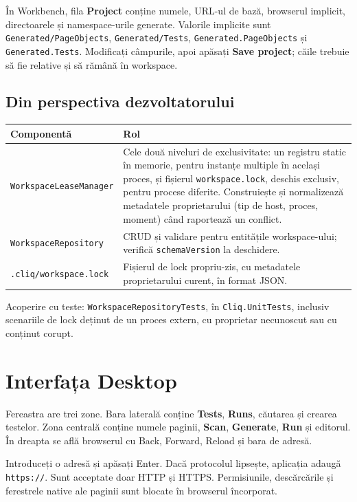 \documentclass[12pt,a4paper]{report}
\newcommand{\UI}[1]{\textbf{#1}}
\newcommand{\File}[1]{\nolinkurl{#1}}
\begin{document}
În Workbench, fila \UI{Project} conține numele, URL-ul de bază, browserul implicit, directoarele și namespace-urile generate. Valorile implicite sunt \File{Generated/PageObjects}, \File{Generated/Tests}, \File{Generated.PageObjects} și \File{Generated.Tests}. Modificați câmpurile, apoi apăsați \UI{Save project}; căile trebuie să fie relative și să rămână în workspace.

\section{Din perspectiva dezvoltatorului}

\begin{tabularx}{\textwidth}{@{}p{5.3cm}Y@{}}
\toprule \textbf{Componentă} & \textbf{Rol} \\
\midrule
\File{WorkspaceLeaseManager} & Cele două niveluri de exclusivitate: un registru static în memorie, pentru instanțe multiple în același proces, și fișierul \File{workspace.lock}, deschis exclusiv, pentru procese diferite. Construiește și normalizează metadatele proprietarului (tip de host, proces, moment) când raportează un conflict. \\
\File{WorkspaceRepository} & CRUD și validare pentru entitățile workspace-ului; verifică \File{schemaVersion} la deschidere. \\
\File{.cliq/workspace.lock} & Fișierul de lock propriu-zis, cu metadatele proprietarului curent, în format JSON. \\
\bottomrule
\end{tabularx}

Acoperire cu teste: \File{WorkspaceRepositoryTests}, în \File{Cliq.UnitTests}, inclusiv scenariile de lock deținut de un proces extern, cu proprietar necunoscut sau cu conținut corupt.

\chapter{Interfața Desktop}

Fereastra are trei zone. Bara laterală conține \UI{Tests}, \UI{Runs}, căutarea și crearea testelor. Zona centrală conține numele paginii, \UI{Scan}, \UI{Generate}, \UI{Run} și editorul. În dreapta se află browserul cu Back, Forward, Reload și bara de adresă.

Introduceți o adresă și apăsați Enter. Dacă protocolul lipsește, aplicația adaugă \File{https://}. Sunt acceptate doar HTTP și HTTPS. Permisiunile, descărcările și ferestrele native ale paginii sunt blocate în browserul încorporat.
\end{document}
